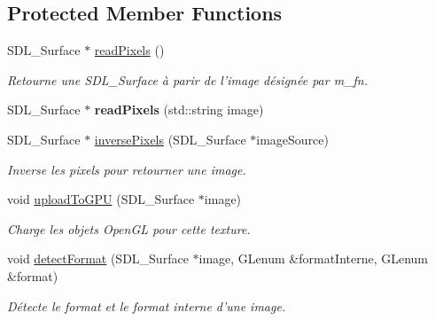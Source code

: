 \subsection*{Protected Member Functions}
\begin{DoxyCompactItemize}
\item 
\hypertarget{classTexture_a2b28225171c8805005b49ba51647369d}{S\-D\-L\-\_\-\-Surface $\ast$ \hyperlink{classTexture_a2b28225171c8805005b49ba51647369d}{read\-Pixels} ()}\label{classTexture_a2b28225171c8805005b49ba51647369d}

\begin{DoxyCompactList}\small\item\em Retourne une S\-D\-L\-\_\-\-Surface à parir de l'image désignée par m\-\_\-fn. \end{DoxyCompactList}\item 
\hypertarget{classTexture_a7f8771fdac09768ef06643ec314d02fb}{S\-D\-L\-\_\-\-Surface $\ast$ {\bfseries read\-Pixels} (std\-::string image)}\label{classTexture_a7f8771fdac09768ef06643ec314d02fb}

\item 
\hypertarget{classTexture_a176dc762ce2e4e7b81ee05998c79beb3}{S\-D\-L\-\_\-\-Surface $\ast$ \hyperlink{classTexture_a176dc762ce2e4e7b81ee05998c79beb3}{inverse\-Pixels} (S\-D\-L\-\_\-\-Surface $\ast$image\-Source)}\label{classTexture_a176dc762ce2e4e7b81ee05998c79beb3}

\begin{DoxyCompactList}\small\item\em Inverse les pixels pour retourner une image. \end{DoxyCompactList}\item 
\hypertarget{classTexture_ad2c6a0ce24d3b8d092abb39d46c41370}{void \hyperlink{classTexture_ad2c6a0ce24d3b8d092abb39d46c41370}{upload\-To\-G\-P\-U} (S\-D\-L\-\_\-\-Surface $\ast$image)}\label{classTexture_ad2c6a0ce24d3b8d092abb39d46c41370}

\begin{DoxyCompactList}\small\item\em Charge les objets Open\-G\-L pour cette texture. \end{DoxyCompactList}\item 
\hypertarget{classTexture_a206c1f87658e5991b722b120cc380ee2}{void \hyperlink{classTexture_a206c1f87658e5991b722b120cc380ee2}{detect\-Format} (S\-D\-L\-\_\-\-Surface $\ast$image, G\-Lenum \&format\-Interne, G\-Lenum \&format)}\label{classTexture_a206c1f87658e5991b722b120cc380ee2}

\begin{DoxyCompactList}\small\item\em Détecte le format et le format interne d'une image. \end{DoxyCompactList}\end{DoxyCompactItemize}

